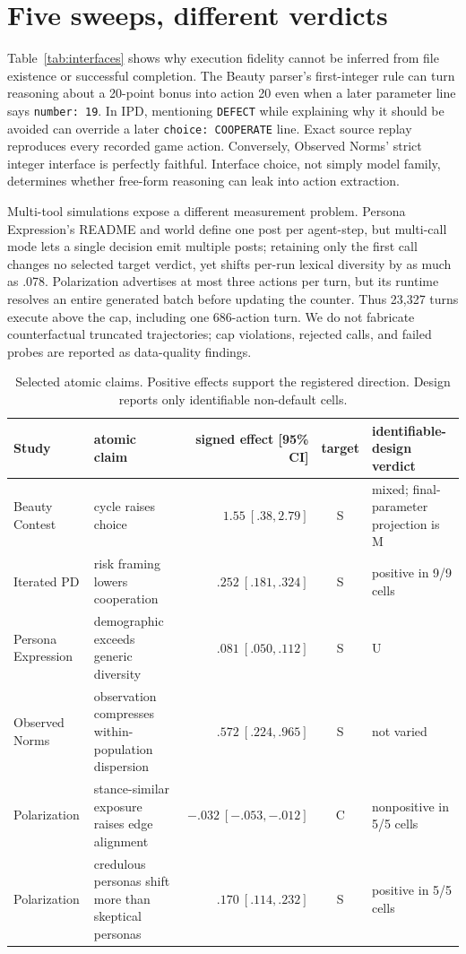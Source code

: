 \documentclass[9pt,twocolumn]{extarticle}
\newcommand{\Spt}{\textsc{S}}
\newcommand{\Mpt}{\textsc{M}}
\newcommand{\Cpt}{\textsc{C}}
\newcommand{\Upt}{\textsc{U}}
\begin{document}
\section{Five sweeps, different verdicts}
Table~\ref{tab:interfaces} shows why execution fidelity cannot be inferred from file existence or successful completion. The Beauty parser's first-integer rule can turn reasoning about a 20-point bonus into action 20 even when a later parameter line says \texttt{number: 19}. In IPD, mentioning \texttt{DEFECT} while explaining why it should be avoided can override a later \texttt{choice: COOPERATE} line. Exact source replay reproduces every recorded game action. Conversely, Observed Norms' strict integer interface is perfectly faithful. Interface choice, not simply model family, determines whether free-form reasoning can leak into action extraction.

Multi-tool simulations expose a different measurement problem. Persona Expression's README and world define one post per agent-step, but multi-call mode lets a single decision emit multiple posts; retaining only the first call changes no selected target verdict, yet shifts per-run lexical diversity by as much as .078. Polarization advertises at most three actions per turn, but its runtime resolves an entire generated batch before updating the counter. Thus 23,327 turns execute above the cap, including one 686-action turn. We do not fabricate counterfactual truncated trajectories; cap violations, rejected calls, and failed probes are reported as data-quality findings.

\begin{table}[t]
\centering
\scriptsize
\caption{Selected atomic claims. Positive effects support the registered direction. Design reports only identifiable non-default cells.}
\label{tab:claims}
\begin{tabular}{@{}llrcl@{}}
\toprule
Study & atomic claim & signed effect [95\% CI] & target & identifiable-design verdict \\
\midrule
Beauty Contest & cycle raises choice & $1.55\ [.38,2.79]$ & \Spt & mixed; final-parameter projection is \Mpt \\
Iterated PD & risk framing lowers cooperation & $.252\ [.181,.324]$ & \Spt & positive in 9/9 cells \\
Persona Expression & demographic exceeds generic diversity & $.081\ [.050,.112]$ & \Spt & \Upt \\
Observed Norms & observation compresses within-population dispersion & $.572\ [.224,.965]$ & \Spt & not varied \\
Polarization & stance-similar exposure raises edge alignment & $-.032\ [-.053,-.012]$ & \Cpt & nonpositive in 5/5 cells \\
Polarization & credulous personas shift more than skeptical personas & $.170\ [.114,.232]$ & \Spt & positive in 5/5 cells \\
\bottomrule
\end{tabular}
\vspace{-0.55em}
\end{table}
\end{document}
